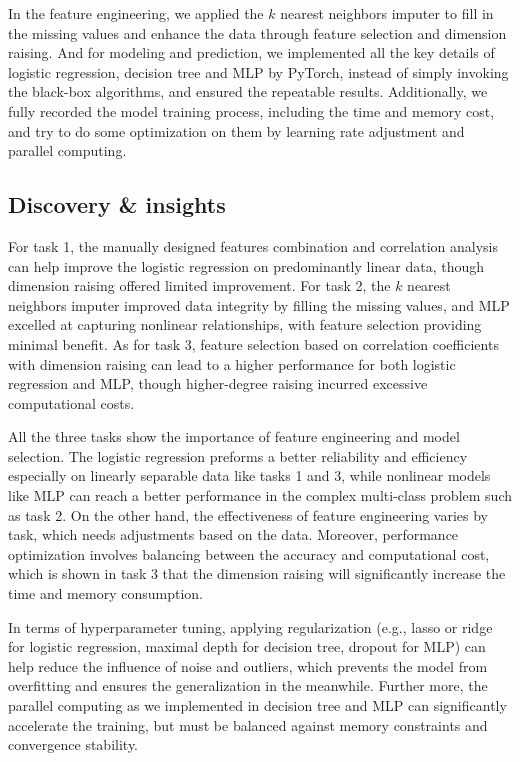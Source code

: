 \documentclass[11pt]{article}
\begin{document}
In the feature engineering, we applied the $k$ nearest neighbors imputer to fill in the missing values and enhance the data through feature selection and dimension raising. And for modeling and prediction, we implemented all the key details of logistic regression, decision tree and MLP by PyTorch, instead of simply invoking the black-box algorithms, and ensured the repeatable results. Additionally, we fully recorded the model training process, including the time and memory cost, and try to do some optimization on them by learning rate adjustment and parallel computing.

\subsection{Discovery \& insights}

For task 1, the manually designed features combination and correlation analysis can help improve the logistic regression on predominantly linear data, though dimension raising offered limited improvement. For task 2, the $k$ nearest neighbors imputer improved data integrity by filling the missing values, and MLP excelled at capturing nonlinear relationships, with feature selection providing minimal benefit. As for task 3, feature selection based on correlation coefficients with dimension raising can lead to a higher performance for both logistic regression and MLP, though higher-degree raising incurred excessive computational costs.

All the three tasks show the importance of feature engineering and model selection. The logistic regression preforms a better reliability and efficiency especially on linearly separable data like tasks 1 and 3, while nonlinear models like MLP can reach a better performance in the complex multi-class problem such as task 2. On the other hand, the effectiveness of feature engineering varies by task, which needs adjustments based on the data. Moreover, performance optimization involves balancing between the accuracy and computational cost, which is shown in task 3 that the dimension raising will significantly increase the time and memory consumption.

In terms of hyperparameter tuning, applying regularization (e.g., lasso or ridge for logistic regression, maximal depth for decision tree, dropout for MLP) can help reduce the influence of noise and outliers, which prevents the model from overfitting and ensures the generalization in the meanwhile. Further more, the parallel computing as we implemented in decision tree and MLP can significantly accelerate the training, but must be balanced against memory constraints and convergence stability.
\end{document}
